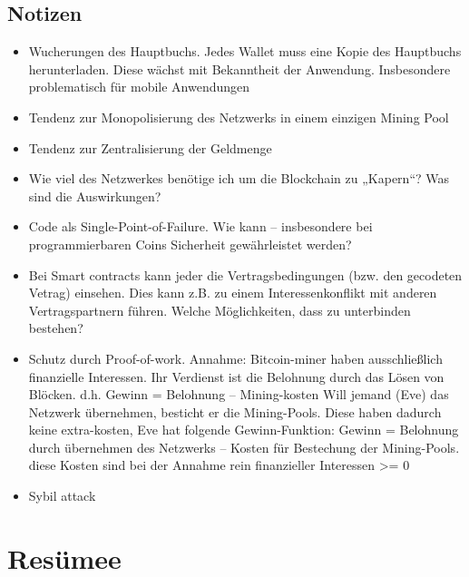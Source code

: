 \subsection{Notizen}
\begin{itemize}
	\item Wucherungen des Hauptbuchs. Jedes Wallet muss eine Kopie des Hauptbuchs herunterladen. Diese wächst mit Bekanntheit der Anwendung. Insbesondere problematisch für mobile Anwendungen
	\item Tendenz zur Monopolisierung des Netzwerks in einem einzigen Mining Pool
	\item Tendenz zur Zentralisierung der Geldmenge
	\item Wie viel des Netzwerkes benötige ich um die Blockchain zu „Kapern“? Was sind die Auswirkungen?
	\item Code als Single-Point-of-Failure. Wie kann – insbesondere bei programmierbaren Coins Sicherheit gewährleistet werden?
	\item Bei Smart contracts kann jeder die Vertragsbedingungen (bzw. den gecodeten Vetrag) einsehen. Dies kann z.B. zu einem Interessenkonflikt mit anderen Vertragspartnern führen. Welche Möglichkeiten, dass zu unterbinden bestehen?
	\item Schutz durch Proof-of-work. Annahme: Bitcoin-miner haben ausschlie{\ss}lich finanzielle Interessen. Ihr Verdienst ist die Belohnung durch das Lösen von Blöcken. d.h. Gewinn = Belohnung – Mining-kosten
	Will jemand (Eve) das Netzwerk übernehmen, besticht er die Mining-Pools. Diese haben dadurch keine extra-kosten, Eve hat folgende Gewinn-Funktion: Gewinn = Belohnung durch übernehmen des Netzwerks – Kosten für Bestechung der Mining-Pools. 
	diese Kosten sind bei der Annahme rein finanzieller Interessen >= 0
	\item Sybil attack
\end{itemize}
\section{Resümee}